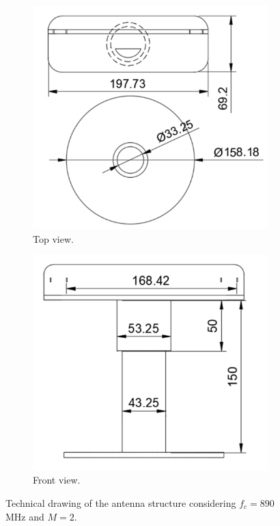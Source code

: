 \documentclass[12pt,a4paper]{report}
\begin{document}
\begin{figure}[!]
    \centering
    \begin{subfigure}{0.4\textwidth}
        \includegraphics[width = \textwidth]{Figures/tb_top.png}
        \caption{Top view.}
    \end{subfigure}
    \begin{subfigure}{0.4\textwidth}
        \includegraphics[width = \textwidth]{Figures/tb_front.png}
        \caption{Front view.}
    \end{subfigure}
    \caption[Technical drawing of the antenna holder.]{Technical drawing of the antenna structure considering $f_c = 890$ MHz and $M = 2$.}
    \label{fig:tb_draw}
\end{figure}
\end{document}
